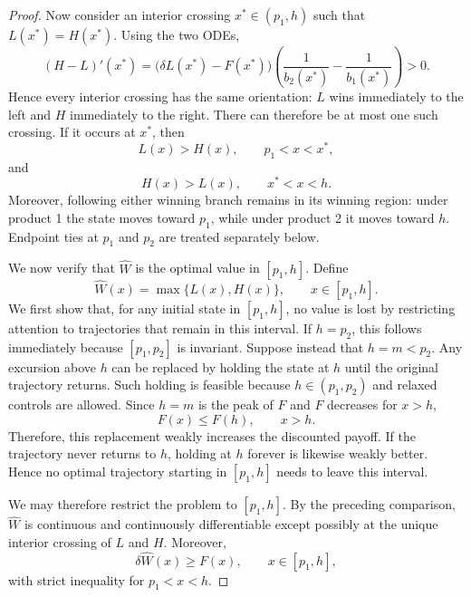 \documentclass[11pt]{article}
\begin{document}
\begin{proof}
Now consider an interior crossing $x^*\in(p_1,h)$ such that
$L(x^*)=H(x^*)$. Using the two ODEs,
\begin{equation*}
       (H-L)'(x^*)=\bigl(\delta L(x^*)-F(x^*)\bigr)\left(\frac{1}{b_2(x^*)}-\frac{1}{b_1(x^*)}\right)>0.
\end{equation*}
Hence every interior crossing has the same orientation: $L$ wins immediately to the left and $H$ immediately to the right. There can therefore be at most one such crossing. If it occurs at $x^*$, then
\begin{equation*}
       L(x)>H(x),\qquad p_1<x<x^*,
\end{equation*}
and
\begin{equation*}
       H(x)>L(x),\qquad x^*<x<h.
\end{equation*}
Moreover, following either winning branch remains in its winning region: under product 1 the state moves toward $p_1$, while under product 2 it moves toward $h$. Endpoint ties at $p_1$ and $p_2$ are treated separately below.

We now verify that $\widehat W$ is the optimal value in $[p_1,h]$. Define
\begin{equation*}
    \widehat W(x)=\max\{L(x),H(x)\},
    \qquad x\in[p_1,h].
\end{equation*}
We first show that, for any initial state in $[p_1,h]$, no value is lost by restricting attention to trajectories that remain in this interval. If $h=p_2$, this follows immediately because $[p_1,p_2]$ is invariant. Suppose instead that
$h=m<p_2$. Any excursion above $h$ can be replaced by holding the state at $h$ until the original trajectory returns. Such holding is feasible because $h\in(p_1,p_2)$ and relaxed controls are allowed. Since $h=m$ is the peak
of $F$ and $F$ decreases for $x>h$,
\begin{equation*}
    F(x)\leq F(h),\qquad x>h.
\end{equation*}
Therefore, this replacement weakly increases the discounted payoff. If the trajectory never returns to $h$, holding at $h$ forever is likewise weakly better. Hence no optimal trajectory starting in $[p_1,h]$ needs to leave
this interval.

We may therefore restrict the problem to $[p_1,h]$. 
By the preceding comparison, $\widehat W$ is continuous and continuously differentiable except possibly at the unique interior crossing of $L$ and $H$. Moreover,
\begin{equation}\label{eq:candidate-holding-bound}
    \delta\widehat W(x)\geq F(x),
    \qquad x\in[p_1,h],
\end{equation}
with strict inequality for $p_1<x<h$.


\end{proof}
\end{document}
